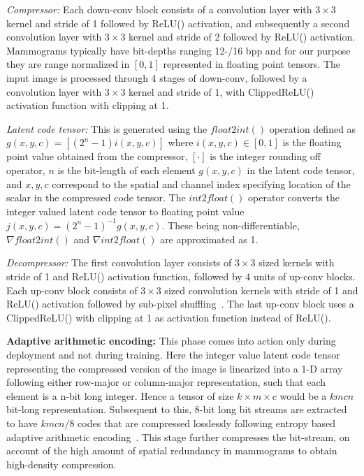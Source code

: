 \documentclass[10pt,twocolumn,letterpaper]{article}
\begin{document}
\emph{Compressor:} Each down-conv block consists of a convolution layer with $3\times3$ kernel and stride of 1 followed by ReLU() activation, and subsequently a second convolution layer with $3\times3$ kernel and stride of 2 followed by ReLU() activation. Mammograms typically have bit-depths ranging 12-/16 bpp and for our purpose they are range normalized in $[0,1]$ represented in floating point tensors. The input image is processed through 4 stages of down-conv, followed by a convolution layer with $3\times3$ kernel and stride of 1, with ClippedReLU() activation function with clipping at 1. 

\emph{Latent code tensor:} This is generated using the $float2int()$ operation defined as $g(x,y,c)=\left[(2^n-1)i(x,y,c)\right]$ where $i(x,y,c)\in[0,1]$ is the floating point value obtained from the compressor, $[\cdot]$ is the integer rounding off operator, $n$ is the bit-length of each element $g(x,y,c)$ in the latent code tensor, and $x,y,c$ correspond to the spatial and channel index specifying location of the scalar in the compressed code tensor. The $int2float()$ operator converts the integer valued latent code tensor to floating point value $j(x,y,c)=(2^n-1)^{-1}g(x,y,c)$. These being non-differentiable, $\nabla float2int()$ and $\nabla int2float()$ are approximated as 1.

\emph{Decompressor:} The first convolution layer consists of $3\times 3$ sized kernels with stride of 1 and ReLU() activation function, followed by 4 units of up-conv blocks. Each up-conv block consists of $3\times 3$ sized convolution kernels with stride of 1 and ReLU() activation followed by sub-pixel shuffling~\cite{shi2016real}. The last up-conv block uses a ClippedReLU() with clipping at 1 as activation function instead of ReLU().

\textbf{Adaptive arithmetic encoding:} This phase comes into action only during deployment and not during training. Here the integer value latent code tensor representing the compressed version of the image is linearized into a 1-D array following either row-major or column-major representation, such that each element is a n-bit long integer. Hence a tensor of size $k\times m \times c$ would be a $kmcn$ bit-long representation. Subsequent to this, 8-bit long bit streams are extracted to have $kmcn/8$ codes that are compressed losslessly following entropy based adaptive arithmetic encoding~\cite{witten1987arithmetic}. This stage further compresses the bit-stream, on account of the high amount of spatial redundancy in mammograms to obtain high-density compression.
\end{document}
